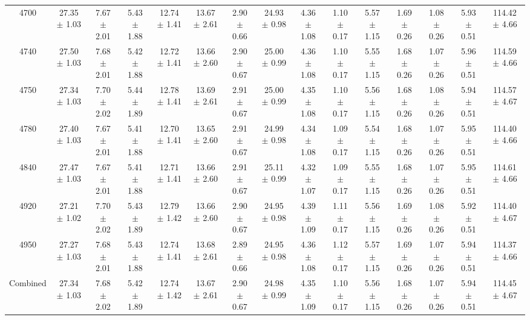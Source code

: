 \begin{table}[H]
{\begin{tabular}{ccccccccccccccc}
        4700 & 27.35 $\pm$ 1.03 & 7.67 $\pm$ 2.01 & 5.43 $\pm$ 1.88 & 12.74 $\pm$ 1.41 & 13.67 $\pm$ 2.61 & 2.90 $\pm$ 0.66 & 24.93 $\pm$ 0.98 & 4.36 $\pm$ 1.08 & 1.10 $\pm$ 0.17 & 5.57 $\pm$ 1.15 & 1.69 $\pm$ 0.26 & 1.08 $\pm$ 0.26 & 5.93 $\pm$ 0.51 & 114.42 $\pm$ 4.66 \\
        4740 & 27.50 $\pm$ 1.03 & 7.68 $\pm$ 2.01 & 5.42 $\pm$ 1.88 & 12.72 $\pm$ 1.41 & 13.66 $\pm$ 2.60 & 2.90 $\pm$ 0.67 & 25.00 $\pm$ 0.99 & 4.36 $\pm$ 1.08 & 1.10 $\pm$ 0.17 & 5.55 $\pm$ 1.15 & 1.68 $\pm$ 0.26 & 1.07 $\pm$ 0.26 & 5.96 $\pm$ 0.51 & 114.59 $\pm$ 4.66 \\
        4750 & 27.34 $\pm$ 1.03 & 7.70 $\pm$ 2.02 & 5.44 $\pm$ 1.89 & 12.78 $\pm$ 1.41 & 13.69 $\pm$ 2.61 & 2.91 $\pm$ 0.67 & 25.00 $\pm$ 0.99 & 4.35 $\pm$ 1.08 & 1.10 $\pm$ 0.17 & 5.56 $\pm$ 1.15 & 1.68 $\pm$ 0.26 & 1.08 $\pm$ 0.26 & 5.94 $\pm$ 0.51 & 114.57 $\pm$ 4.67 \\
        4780 & 27.40 $\pm$ 1.03 & 7.67 $\pm$ 2.01 & 5.41 $\pm$ 1.88 & 12.70 $\pm$ 1.41 & 13.65 $\pm$ 2.60 & 2.91 $\pm$ 0.67 & 24.99 $\pm$ 0.98 & 4.34 $\pm$ 1.08 & 1.09 $\pm$ 0.17 & 5.54 $\pm$ 1.15 & 1.68 $\pm$ 0.26 & 1.07 $\pm$ 0.26 & 5.95 $\pm$ 0.51 & 114.40 $\pm$ 4.66 \\
        4840 & 27.47 $\pm$ 1.03 & 7.67 $\pm$ 2.01 & 5.41 $\pm$ 1.88 & 12.71 $\pm$ 1.41 & 13.66 $\pm$ 2.60 & 2.91 $\pm$ 0.67 & 25.11 $\pm$ 0.99 & 4.32 $\pm$ 1.07 & 1.09 $\pm$ 0.17 & 5.55 $\pm$ 1.15 & 1.68 $\pm$ 0.26 & 1.07 $\pm$ 0.26 & 5.95 $\pm$ 0.51 & 114.61 $\pm$ 4.66 \\
        4920 & 27.21 $\pm$ 1.02 & 7.70 $\pm$ 2.02 & 5.43 $\pm$ 1.89 & 12.79 $\pm$ 1.42 & 13.66 $\pm$ 2.60 & 2.90 $\pm$ 0.67 & 24.95 $\pm$ 0.98 & 4.39 $\pm$ 1.09 & 1.11 $\pm$ 0.17 & 5.56 $\pm$ 1.15 & 1.69 $\pm$ 0.26 & 1.08 $\pm$ 0.26 & 5.92 $\pm$ 0.51 & 114.40 $\pm$ 4.67 \\
        4950 & 27.27 $\pm$ 1.03 & 7.68 $\pm$ 2.01 & 5.43 $\pm$ 1.88 & 12.74 $\pm$ 1.41 & 13.68 $\pm$ 2.61 & 2.89 $\pm$ 0.66 & 24.95 $\pm$ 0.98 & 4.36 $\pm$ 1.08 & 1.12 $\pm$ 0.17 & 5.57 $\pm$ 1.15 & 1.69 $\pm$ 0.26 & 1.07 $\pm$ 0.26 & 5.94 $\pm$ 0.51 & 114.37 $\pm$ 4.66 \\
        Combined  & 27.34 $\pm$ 1.03 & 7.68 $\pm$ 2.02 & 5.42 $\pm$ 1.89 & 12.74 $\pm$ 1.42 & 13.67 $\pm$ 2.61 & 2.90 $\pm$ 0.67 & 24.98 $\pm$ 0.99 & 4.35 $\pm$ 1.09 & 1.10 $\pm$ 0.17 & 5.56 $\pm$ 1.15 & 1.68 $\pm$ 0.26 & 1.07 $\pm$ 0.26 & 5.94 $\pm$ 0.51 & 114.45 $\pm$ 4.67\\
       
    \hline\hline
    \end{tabular}}
\end{table}

